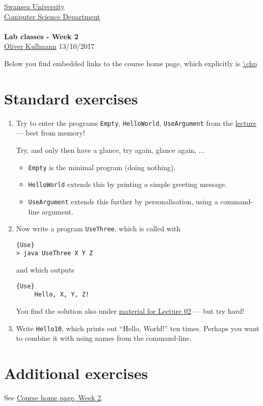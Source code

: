 \documentclass[11pt]{article}
\newcommand{\Java}{\lstset{language=Java,keywordstyle=\bfseries,breaklines,breakindent=30pt}}
\begin{document}
\begin{center}
  \href{http://www.swan.ac.uk/}{Swansea University}\\
  \href{http://www.swan.ac.uk/compsci/}{Computer Science Department}\\[1ex]
  \href{\chp}{\module}\\[1ex]
  \textbf{Lab classes - Week 2}\\
  \href{http://cs.swan.ac.uk/~csoliver}{Oliver Kullmann} 13/10/2017
\end{center}

Below you find embedded links to the course home page, which explicitly is \url{\chp}

\section{Standard exercises}
\label{sec:stdex}

\Java

\begin{enumerate}
\item Try to enter the programs \texttt{Empty}, \texttt{HelloWorld}, \texttt{UseArgument} from the \href{\chp\#LecturesWeek02}{lecture} --- best from memory!
  \begin{center}
    Try, and only then have a glance, try again, glance again, ...
  \end{center}
  \begin{itemize}
  \item \texttt{Empty} is the minimal program (doing nothing).
  \item \texttt{HelloWorld} extends this by printing a simple greeting message.
  \item \texttt{UseArgument} extends this further by personalisation, using a command-line argument.
  \end{itemize}
\item Now write a program \texttt{UseThree}, which is called with
  \begin{lstlisting}{Use}
> java UseThree X Y Z
  \end{lstlisting}
   and which outputs
   \begin{lstlisting}{Use}
     Hello, X, Y, Z!
   \end{lstlisting}
   You find the solution also under \href{\chp\#LecturesWeek02}{material for Lecture 02} --- but try hard!
 \item Write \texttt{Hello10}, which prints out ``Hello, World!'' ten times. Perhaps you want to combine it with using names from the command-line.
\end{enumerate}


\section{Additional exercises}
\label{sec:addex}

See \href{\chp\#ExercisesWeek02}{Course home page, Week 2}.
\end{document}
